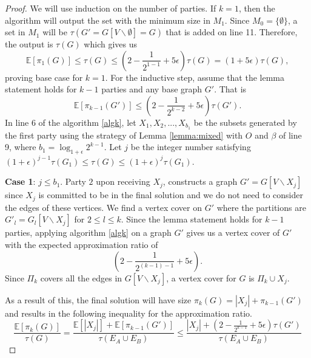 \documentclass[11pt]{article}
\newcommand{\E}[0]{\ensuremath{\mathbb{E}}}
\newcommand{\mvc}[1]{\tau\left(#1 \right)}
\newcommand{\out}{\ensuremath{\Pi}}
\begin{document}
\begin{proof}
    We will use induction on the number of parties.
    If $k=1$, then the algorithm will output the set with the minimum size in $M_1$. Since $M_0 = \{ \emptyset \}$, a set in $M_1$ will be $\mvc{G'= G[V \backslash \emptyset] = G}$ that is added on line 11. Therefore, the output is $\mvc{G}$ which gives us
    \[\E[\pi_{1}(G)] \leq \mvc{G} \leq (2 - \frac{1}{2^{1-1}} + 5 \epsilon) \mvc{G} = (1 + 5\epsilon)\mvc{G},\] proving base case for $k=1$.
     For the inductive step, assume that the lemma statement holds for $k-1$ parties and any base graph $G'$. That is 
    \begin{equation}
    \label{eq:inductive}
       \E[ \pi_{k-1}(G')] \leq (2 - \frac{1}{2^{k-2}} + 5 \epsilon) \mvc{G'}.
    \end{equation}
In line 6 of the algorithm \ref{algk}, let $X_{1}, X_{2},..., X_{b_1}$ be the subsets generated by the first party using the strategy of Lemma \ref{lemma:mixed} with $O$ and $\beta$ of line 9, where $b_1 = \log_{1 + \epsilon} 2^{k-1}$.
    Let $j$ be the integer number satisfying $ (1 + \epsilon)^{j-1} \mvc{G_1} \leq \mvc{G} \leq (1 + \epsilon)^{j} \mvc{G_1}$. 

    \textbf{Case 1}: $j \leq b_1 $.
    Party $2$ upon receiving $X_{j}$, constructs a graph $G' = G[V \backslash X_{j}]$ since $X_{j}$ is committed to be in the final solution and we do not need to consider the edges of these vertices. We find a vertex cover on $G'$ where the partitions are $G'_l = G_l[V \backslash X_{j}]$ for  $2 \leq l \leq k$. Since the lemma statement holds for $k-1$ parties, applying algorithm \ref{algk} on a graph $G'$ gives us a vertex cover of $G'$ with the expected approximation ratio of \[(2 - \frac{1}{2^{(k-1)-1}} + 5 \epsilon).\]
    Since $\out_k$ covers all the edges in $G[V \backslash X_{j}]$, a vertex cover for $G$ is $\out_k \cup X_{j}$.

    As a result of this, the final solution will have size $\pi_{k}(G) = |X_{j}| + \pi_{k-1}(G')$ and results in the following inequality for the approximation ratio.
    \begin{equation}
    \label{eq:eq2}
        \frac{\E[\pi_{k}(G)]}{\mvc{G}} = \frac{\E[|X_{j}|] + \E[\pi_{k-1}(G')]}{\mvc{E_A \cup E_B}} \leq \frac{|X_{j}| + (2 - \frac{1}{2^{k-1}} + 5\epsilon) \mvc{G'}}{\mvc{E_A \cup E_B}}
    \end{equation}


\end{proof}
\end{document}
